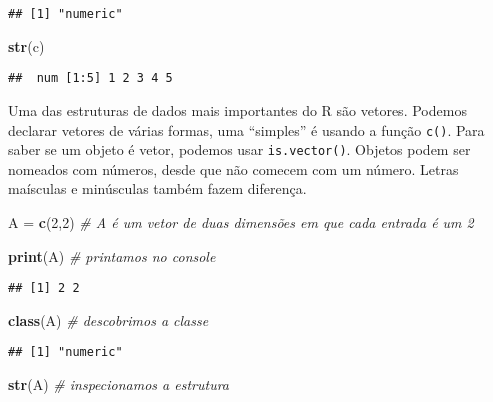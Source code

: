 \documentclass[]{article}
\newenvironment{Shaded}{\begin{snugshade}}{\end{snugshade}}
\newcommand{\CommentTok}[1]{\textcolor[rgb]{0.56,0.35,0.01}{\textit{#1}}}
\newcommand{\DecValTok}[1]{\textcolor[rgb]{0.00,0.00,0.81}{#1}}
\newcommand{\KeywordTok}[1]{\textcolor[rgb]{0.13,0.29,0.53}{\textbf{#1}}}
\newcommand{\NormalTok}[1]{#1}
\newcommand{\StringTok}[1]{\textcolor[rgb]{0.31,0.60,0.02}{#1}}
\begin{document}
\begin{verbatim}
## [1] "numeric"
\end{verbatim}

\begin{Shaded}
\begin{Highlighting}[]
\KeywordTok{str}\NormalTok{(c)}
\end{Highlighting}
\end{Shaded}

\begin{verbatim}
##  num [1:5] 1 2 3 4 5
\end{verbatim}

Uma das estruturas de dados mais importantes do R são vetores. Podemos
declarar vetores de várias formas, uma ``simples'' é usando a função
\texttt{c()}. Para saber se um objeto é vetor, podemos usar
\texttt{is.vector()}. Objetos podem ser nomeados com números, desde que
não comecem com um número. Letras maísculas e minúsculas também fazem
diferença.

\begin{Shaded}
\begin{Highlighting}[]
\NormalTok{A =}\StringTok{ }\KeywordTok{c}\NormalTok{(}\DecValTok{2}\NormalTok{,}\DecValTok{2}\NormalTok{) }\CommentTok{# A é um vetor de duas dimensões em que cada entrada é um 2}

\KeywordTok{print}\NormalTok{(A) }\CommentTok{# printamos no console}
\end{Highlighting}
\end{Shaded}

\begin{verbatim}
## [1] 2 2
\end{verbatim}

\begin{Shaded}
\begin{Highlighting}[]
\KeywordTok{class}\NormalTok{(A) }\CommentTok{# descobrimos a classe}
\end{Highlighting}
\end{Shaded}

\begin{verbatim}
## [1] "numeric"
\end{verbatim}

\begin{Shaded}
\begin{Highlighting}[]
\KeywordTok{str}\NormalTok{(A) }\CommentTok{# inspecionamos a estrutura}
\end{Highlighting}
\end{Shaded}
\end{document}

